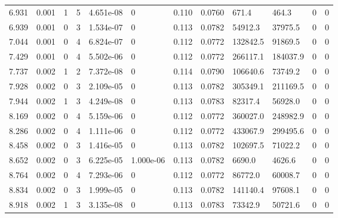 \documentclass[preview]{standalone}
\begin{document}
{{\begin{tabular}{L{1.2cm}C{1.2cm} C{0.3cm}C{0.5cm} C{1.4cm}C{1.4cm} C{1.4cm}C{1.4cm} C{1.6cm}C{1.6cm} C{1.6cm}C{1.6cm}}
  6.931  &  0.001  & 1     &  5 &  4.651e-08  & 0  &  0.110&   0.0760& 671.4 & 464.3   &  0 & 0  \\ 
  6.939  &  0.001  & 0     &  3 &  1.534e-07  & 0  &  0.113&   0.0782& 54912.3 & 37975.5   &  0 & 0  \\ 
  7.044  &  0.001  & 0     &  4 &  6.824e-07  & 0  &  0.112&   0.0772& 132842.5 & 91869.5   &  0 & 0  \\ 
  7.429  &  0.001  & 0     &  4 &  5.502e-06  & 0  &  0.112&   0.0772& 266117.1 & 184037.9   &  0 & 0  \\ 
  7.737  &  0.002  & 1     &  2 &  7.372e-08  & 0  &  0.114&   0.0790& 106640.6 & 73749.2   &  0 & 0  \\ 
  7.928  &  0.002  & 0     &  3 &  2.109e-05  & 0  &  0.113&   0.0782& 305349.1 & 211169.5   &  0 & 0  \\ 
  7.944  &  0.002  & 1     &  3 &  4.249e-08  & 0  &  0.113&   0.0783& 82317.4 & 56928.0   &  0 & 0  \\ 
  8.169  &  0.002  & 0     &  4 &  5.159e-06  & 0  &  0.112&   0.0772& 360027.0 & 248982.9   &  0 & 0  \\ 
  8.286  &  0.002  & 0     &  4 &  1.111e-06  & 0  &  0.112&   0.0772& 433067.9 & 299495.6   &  0 & 0  \\ 
  8.458  &  0.002  & 0     &  3 &  1.416e-05  & 0  &  0.113&   0.0782& 102697.5 & 71022.2   &  0 & 0  \\ 
  8.652  &  0.002  & 0     &  3 &  6.225e-05  & 1.000e-06  &  0.113&   0.0782& 6690.0 & 4626.6   &  0 & 0  \\ 
  8.764  &  0.002  & 0     &  4 &  7.293e-06  & 0  &  0.112&   0.0772& 86772.0 & 60008.7   &  0 & 0  \\ 
  8.834  &  0.002  & 0     &  3 &  1.999e-05  & 0  &  0.113&   0.0782& 141140.4 & 97608.1   &  0 & 0  \\ 
  8.918  &  0.002  & 1     &  3 &  3.135e-08  & 0  &  0.113&   0.0783& 73342.9 & 50721.6   &  0 & 0  \\ 
\hline 
\end{tabular} 

}}
\end{document}
